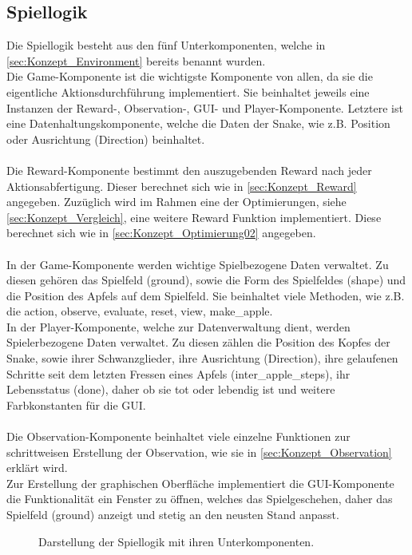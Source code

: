 \subsection{Spiellogik} \label{sec:Konzept_Spiellogik}
Die Spiellogik besteht aus den fünf Unterkomponenten, welche in \ref{sec:Konzept_Environment} bereits benannt wurden.\\
Die Game-Komponente ist die wichtigste Komponente von allen, da sie die eigentliche Aktionsdurchführung implementiert. Sie beinhaltet jeweils eine Instanzen der Reward-, Observation-, GUI- und Player-Komponente. Letztere ist eine Datenhaltungskomponente, welche die Daten der Snake, wie z.B. Position oder Ausrichtung (Direction) beinhaltet.\\
\\Die Reward-Komponente bestimmt den auszugebenden Reward nach jeder Aktionsabfertigung. Dieser berechnet sich wie in \ref{sec:Konzept_Reward} angegeben. Zuzüglich wird im Rahmen eine der Optimierungen, siehe \ref{sec:Konzept_Vergleich}, eine weitere Reward Funktion implementiert. Diese berechnet sich wie in \ref{sec:Konzept_Optimierung02} angegeben.\\
\\In der Game-Komponente werden wichtige Spielbezogene Daten verwaltet. Zu diesen gehören das Spielfeld (ground), sowie die Form des Spielfeldes (shape) und die Position des Apfels auf dem Spielfeld. Sie beinhaltet viele Methoden, wie z.B. die action, observe, evaluate, reset, view, make\_apple.
\\In der Player-Komponente, welche zur Datenverwaltung dient, werden Spielerbezogene Daten verwaltet. Zu diesen zählen die Position des Kopfes der Snake, sowie ihrer Schwanzglieder, ihre Ausrichtung (Direction), ihre gelaufenen Schritte seit dem letzten Fressen eines Apfels (inter\_apple\_steps), ihr Lebensstatus (done), daher ob sie tot oder lebendig ist und weitere Farbkonstanten für die GUI.\\
\\Die Observation-Komponente beinhaltet viele einzelne Funktionen zur schrittweisen Erstellung der Observation, wie sie in \ref{sec:Konzept_Observation} erklärt wird.
\\Zur Erstellung der graphischen Oberfläche implementiert die GUI-Komponente die Funktionalität ein Fenster zu öffnen, welches das Spielgeschehen, daher das Spielfeld (ground) anzeigt und stetig an den neusten Stand anpasst.
\begin{figure}[H]
	\centering
	\def\svgscale{0.17}
	
	\caption[Spiellogik]{Darstellung der Spiellogik mit ihren Unterkomponenten.}
	\label{fig:Spiellogik}
\end{figure}

